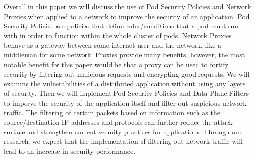 
Overall in this paper we will discuss the use of Pod Security Policies and Network Proxies 
when applied to a network to improve the security of an application. Pod Security Policies
are policies that define rules/conditions that a pod must run with in order to function within
the whole cluster of pods. Network Proxies behave as a gateway between some internet user and the network,
like a middleman for some network. Proxies provide many benefits, however, the most notable benefit for
this paper would be that a proxy can be used to fortify security by filtering out malicious requests and
encrypting good requests. We will examine the vulnerabilities of a distributed application without using
any layers of security. Then we will implement Pod Security Policies and Data Plane Filters
to imporve the security of the application itself and filter out suspicious network traffic.
The filtering of certain packets based on information such as the source/destination
IP addresses and protocols can further reduce the attack surface and strengthen current security practices
for applications. Through our research, we expect that the implementation of filtering
out network traffic will lead to an increase in security performance.